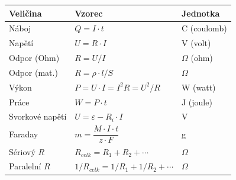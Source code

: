 \documentclass[a4paper,10pt]{article}
\begin{document}
\begin{vysvetlenibox}
\begin{center}
\begin{tabularx}{0.97\linewidth}{@{} l l l @{}}
\toprule
\textbf{Veličina} & \textbf{Vzorec} & \textbf{Jednotka} \\
\midrule
Náboj & $Q = I \cdot t$ & C (coulomb) \\
Napětí & $U = R \cdot I$ & V (volt) \\
Odpor (Ohm) & $R = U / I$ & $\Omega$ (ohm) \\
Odpor (mat.) & $R = \rho \cdot l / S$ & $\Omega$ \\
Výkon & $P = U \cdot I = I^2 R = U^2/R$ & W (watt) \\
Práce & $W = P \cdot t$ & J (joule) \\
Svorkové napětí & $U = \varepsilon - R_i \cdot I$ & V \\
Faraday & $m = \dfrac{M \cdot I \cdot t}{z \cdot F}$ & g \\
Sériový $R$ & $R_{celk} = R_1 + R_2 + \cdots$ & $\Omega$ \\
Paralelní $R$ & $1/R_{celk} = 1/R_1 + 1/R_2 + \cdots$ & $\Omega$ \\
\bottomrule
\end{tabularx}
\end{center}

\end{vysvetlenibox}
\end{document}
